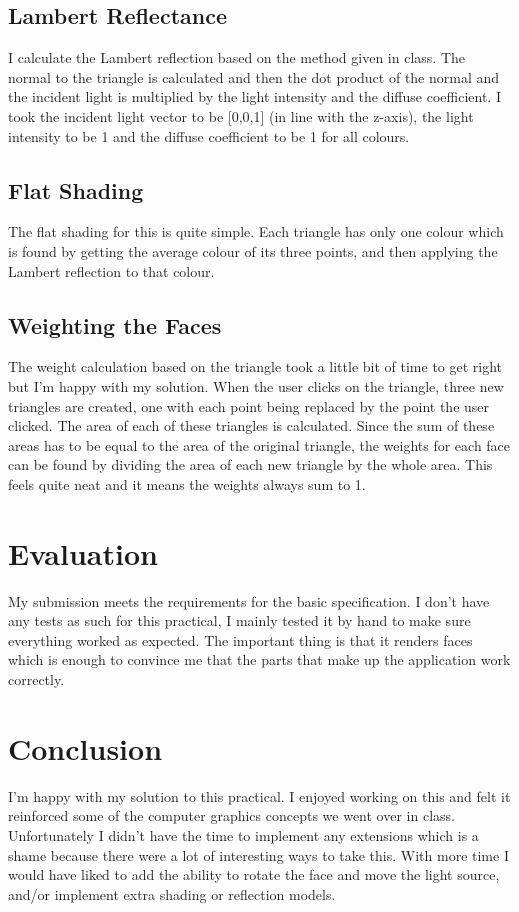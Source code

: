 \documentclass{article}
\begin{document}
\subsection{Lambert Reflectance}
I calculate the Lambert reflection based on the method given in 
class. The normal to the triangle is calculated 
and then the dot product of the normal and the incident 
light is multiplied by the light intensity  and 
the diffuse coefficient. I took the incident light 
vector to be [0,0,1] (in line with the z-axis), 
the light intensity to be 1 and the diffuse coefficient to be 
1 for all colours.

\subsection{Flat Shading}
The flat shading for this is quite simple. Each triangle 
has only one colour which is found by getting the average colour of 
its three points, and then applying the Lambert reflection to 
that colour. 

\subsection{Weighting the Faces}
The weight calculation based on the triangle 
took a little bit of time to get right 
but I'm happy with my solution. When the 
user clicks on the triangle, three new 
triangles are created, one with each point being replaced 
by the point the user clicked. The area of each of these triangles 
is calculated. Since the sum of these areas has to be 
equal to the area of the original triangle, the weights 
for each face can be found by dividing the area 
of each new triangle by the whole area. This feels
quite neat and it means the weights always sum to 1. 

\section{Evaluation}
My submission meets the requirements for the basic 
specification. I don't have any tests 
as such for this practical, I mainly tested it by hand to make 
sure everything worked as expected. The important thing 
is that it renders faces which is enough to convince me that the 
parts that make up the application work correctly. 

\section{Conclusion}
I'm happy with my solution to this practical. 
I enjoyed working on this and felt it reinforced some of the 
computer graphics concepts we went over in class. 
Unfortunately I didn't have the time to implement any extensions 
which is a shame because there were a lot of interesting ways to 
take this. With more time I would have liked to add the ability to 
rotate the face and move the light source, and/or implement extra shading 
or reflection models. 
\end{document}
